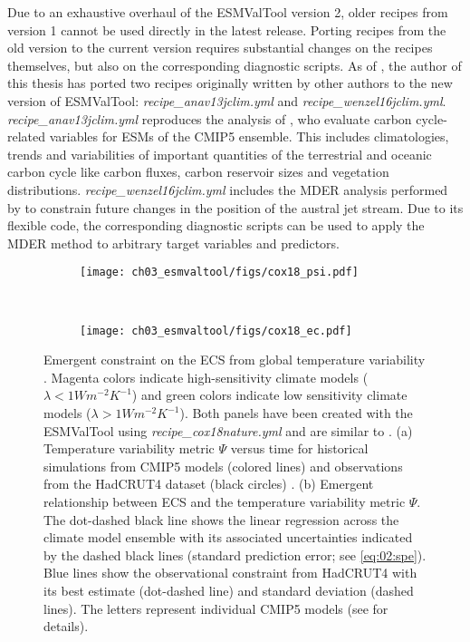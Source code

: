 Due to an exhaustive overhaul of the \ac{ESMValTool} version 2, older recipes
from version 1 \autocite{Eyring2016a} cannot be used directly in the latest
release. Porting recipes from the old version to the current version requires
substantial changes on the recipes themselves, but also on the corresponding
diagnostic scripts. As of \TheMonth{}, the author of this thesis has ported two
recipes originally written by other authors to the new version of
\ac{ESMValTool}: \emph{recipe\_anav13jclim.yml} and
\emph{recipe\_wenzel16jclim.yml}. \emph{recipe\_anav13jclim.yml} reproduces the
analysis of \textcite{Anav2013}, who evaluate carbon cycle-related variables
for \acp{ESM} of the \acs{CMIP}5 ensemble. This includes climatologies, trends
and variabilities of important quantities of the terrestrial and oceanic carbon
cycle like carbon fluxes, carbon reservoir sizes and vegetation distributions.
\emph{recipe\_wenzel16jclim.yml} includes the \ac{MDER} analysis performed by
\textcite{Wenzel2016a} to constrain future changes in the position of the
austral jet stream. Due to its flexible code, the corresponding diagnostic
scripts can be used to apply the \ac{MDER} method to arbitrary target variables
and predictors.

\begin{figure}[t]
  \centering
  \begin{subfigure}[b]{\SubfigureWidth{}}
    \texttt{[image: ch03\_esmvaltool/figs/cox18\_psi.pdf]}
    \caption{}
    \label{fig:03:cox18:a}
  \end{subfigure}
  ~
  \begin{subfigure}[b]{\SubfigureWidth{}}
    \texttt{[image: ch03\_esmvaltool/figs/cox18\_ec.pdf]}
    \caption{}
    \label{fig:03:cox18:b}
  \end{subfigure}
  \caption{Emergent constraint on the \acf{ECS} from global temperature
    variability \autocite{Cox2018}. Magenta colors indicate high-sensitivity
    climate models ($\lambda < 1 \unit{W m^{-2} K^{-1}}$) and green colors
    indicate low sensitivity climate models ($\lambda > 1 \unit{W m^{-2}
      K^{-1}}$). Both panels have been created with the \acs{ESMValTool} using
    \emph{recipe\_cox18nature.yml} and are similar to \textcite{Cox2018}. (a)
    Temperature variability metric $\Psi$ versus time for historical
    simulations from \acs{CMIP}5 models (colored lines) and observations from
    the HadCRUT4 dataset (black circles) \autocite{Morice2012}. (b) Emergent
    relationship between \acs{ECS} and the temperature variability metric
    $\Psi$. The dot-dashed black line shows the linear regression across the
    climate model ensemble with its associated uncertainties indicated by the
    dashed black lines (standard prediction error; see \cref{eq:02:spe}). Blue
    lines show the observational constraint from HadCRUT4 with its best
    estimate (dot-dashed line) and standard deviation (dashed lines). The
    letters represent individual \acs{CMIP}5 models (see \textcite{Cox2018}
    for details).}
  \label{fig:03:cox18}
\end{figure}

